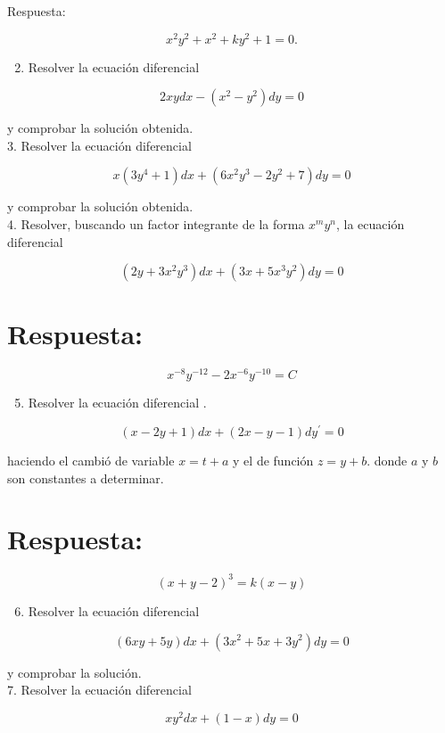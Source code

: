 \documentclass[10pt]{article}
\theoremstyle{plain}
\theoremstyle{definition}
\theoremstyle{remark}
\begin{document}
Respuesta:

$$
x^{2} y^{2}+x^{2}+k y^{2}+1=0 .
$$

\begin{enumerate}
  \setcounter{enumi}{1}
  \item Resolver la ecuación diferencial
\end{enumerate}

$$
2 x y d x-\left(x^{2}-y^{2}\right) d y=0
$$

y comprobar la solución obtenida.\\
3. Resolver la ecuación diferencial

$$
x\left(3 y^{4}+1\right) d x+\left(6 x^{2} y^{3}-2 y^{2}+7\right) d y=0
$$

y comprobar la solución obtenida.\\
4. Resolver, buscando un factor integrante de la forma $x^{m} y^{n}$, la ecuación diferencial

$$
\left(2 y+3 x^{2} y^{3}\right) d x+\left(3 x+5 x^{3} y^{2}\right) d y=0
$$

\section*{Respuesta:}
$$
x^{-8} y^{-12}-2 x^{-6} y^{-10}=C
$$

\begin{enumerate}
  \setcounter{enumi}{4}
  \item Resolver la ecuación diferencial .
\end{enumerate}

$$
(x-2 y+1) d x+(2 x-y-1) d y^{\prime}=0
$$

haciendo el cambió de variable $x=t+a$ y el de función $z=y+b$. donde $a$ y $b$ son constantes a determinar.

\section*{Respuesta:}
$$
(x+y-2)^{3}=k(x-y)
$$

\begin{enumerate}
  \setcounter{enumi}{5}
  \item Resolver la ecuación diferencial
\end{enumerate}

$$
(6 x y+5 y) d x+\left(3 x^{2}+5 x+3 y^{2}\right) d y=0
$$

y comprobar la solución.\\
7. Resolver la ecuación diferencial

$$
x y^{2} d x+(1-x) d y=0
$$
\end{document}
